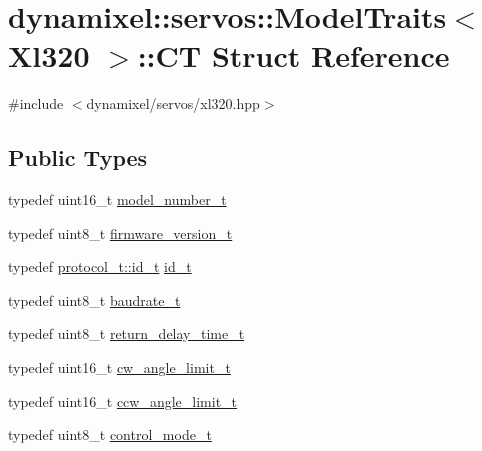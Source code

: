 \hypertarget{structdynamixel_1_1servos_1_1_model_traits_3_01_xl320_01_4_1_1_c_t}{}\section{dynamixel\+:\+:servos\+:\+:Model\+Traits$<$ Xl320 $>$\+:\+:CT Struct Reference}
\label{structdynamixel_1_1servos_1_1_model_traits_3_01_xl320_01_4_1_1_c_t}


{\ttfamily \#include $<$dynamixel/servos/xl320.\+hpp$>$}

\subsection*{Public Types}
\begin{DoxyCompactItemize}
\item 
typedef uint16\+\_\+t \hyperlink{structdynamixel_1_1servos_1_1_model_traits_3_01_xl320_01_4_1_1_c_t_aacfc8eec67dfec7e83d7aebcfad8caf7}{model\+\_\+number\+\_\+t}
\item 
typedef uint8\+\_\+t \hyperlink{structdynamixel_1_1servos_1_1_model_traits_3_01_xl320_01_4_1_1_c_t_a09705200b7923d6290e1887f57583610}{firmware\+\_\+version\+\_\+t}
\item 
typedef \hyperlink{classdynamixel_1_1protocols_1_1_protocol2_a38d9cae72cd86213cca74e718c240429}{protocol\+\_\+t\+::id\+\_\+t} \hyperlink{structdynamixel_1_1servos_1_1_model_traits_3_01_xl320_01_4_1_1_c_t_a7198088e049557b59ff1ace206a593be}{id\+\_\+t}
\item 
typedef uint8\+\_\+t \hyperlink{structdynamixel_1_1servos_1_1_model_traits_3_01_xl320_01_4_1_1_c_t_a7404f29aac21de1cb5357b23dc06e82d}{baudrate\+\_\+t}
\item 
typedef uint8\+\_\+t \hyperlink{structdynamixel_1_1servos_1_1_model_traits_3_01_xl320_01_4_1_1_c_t_a11370bf1ecea307f9f5ffbbcff181c64}{return\+\_\+delay\+\_\+time\+\_\+t}
\item 
typedef uint16\+\_\+t \hyperlink{structdynamixel_1_1servos_1_1_model_traits_3_01_xl320_01_4_1_1_c_t_a319479d6017a4430b9e05e378de557e0}{cw\+\_\+angle\+\_\+limit\+\_\+t}
\item 
typedef uint16\+\_\+t \hyperlink{structdynamixel_1_1servos_1_1_model_traits_3_01_xl320_01_4_1_1_c_t_a09dffdec3328d3c045ff12373b25d895}{ccw\+\_\+angle\+\_\+limit\+\_\+t}
\item 
typedef uint8\+\_\+t \hyperlink{structdynamixel_1_1servos_1_1_model_traits_3_01_xl320_01_4_1_1_c_t_a563172c7945c1ac77119e6c76d3adc60}{control\+\_\+mode\+\_\+t}

\end{DoxyCompactItemize}
